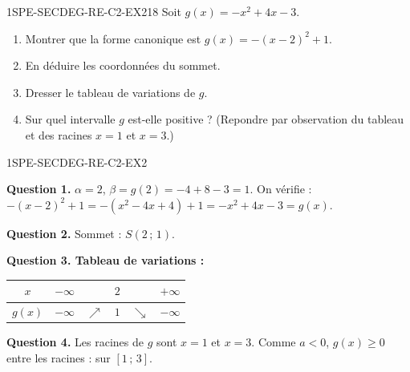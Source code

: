 
\begin{exercice}{1SPE-SECDEG-RE-C2-EX2}{1}{8}
Soit $g(x) = -x^2 + 4x - 3$.
\begin{enumerate}
  \item Montrer que la forme canonique est $g(x) = -(x-2)^2 + 1$.
  \item En déduire les coordonnées du sommet.
  \item Dresser le tableau de variations de $g$.
  \item Sur quel intervalle $g$ est-elle positive ? (Repondre par observation du tableau et des racines $x = 1$ et $x = 3$.)
\end{enumerate}
\end{exercice}



\begin{corrige}{1SPE-SECDEG-RE-C2-EX2}

\textbf{Question 1.} $\alpha = 2$, $\beta = g(2) = -4 + 8 - 3 = 1$. On vérifie : $-(x-2)^2 + 1 = -(x^2-4x+4)+1 = -x^2+4x-3 = g(x)$. \checkmark

\textbf{Question 2.} Sommet : $S(2\,;\,1)$.


\textbf{Question 3. Tableau de variations :}

\begin{center}
\begin{tabular}{|c|ccccc|}
\hline
$x$ & $-\infty$ & & $2$ & & $+\infty$ \\
\hline
$g(x)$ & $-\infty$ & $\nearrow$ & $1$ & $\searrow$ & $-\infty$ \\
\hline
\end{tabular}
\end{center}

\textbf{Question 4.} Les racines de $g$ sont $x = 1$ et $x = 3$. Comme $a < 0$, $g(x) \geq 0$ entre les racines : sur $[1\,;\,3]$.

\end{corrige}

